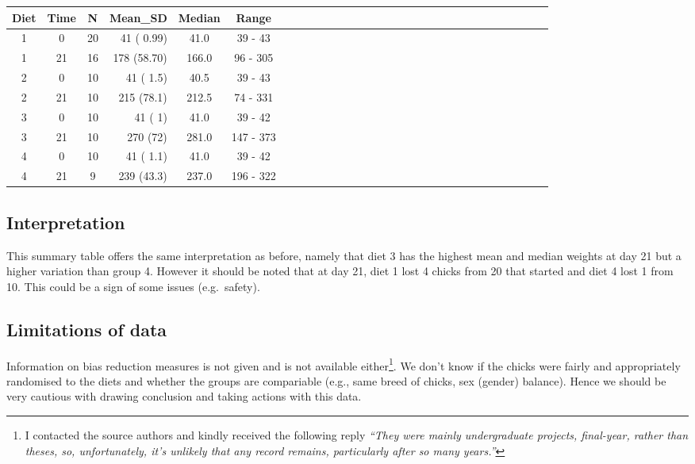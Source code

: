 \documentclass[a4paper,9pt,twocolumn,twoside,printwatermark=false]{pinp}
\begin{document}
\begin{table}[H]
\centering
\begin{tabular}{cccrccccrccccrccccrccccrccccrc}
\toprule
\textbf{Diet} & \textbf{Time} & \textbf{N} & \textbf{Mean\_SD} & \textbf{Median} & \textbf{Range}\\
\midrule
1 & 0 & 20 & 41 ( 0.99) & 41.0 & 39 - 43\\
\rowcolor{lightgray}  1 & 21 & 16 & 178 (58.70) & 166.0 & 96 - 305\\
2 & 0 & 10 & 41 ( 1.5) & 40.5 & 39 - 43\\
\rowcolor{lightgray}  2 & 21 & 10 & 215 (78.1) & 212.5 & 74 - 331\\
3 & 0 & 10 & 41 ( 1) & 41.0 & 39 - 42\\
\rowcolor{lightgray}  3 & 21 & 10 & 270 (72) & 281.0 & 147 - 373\\
4 & 0 & 10 & 41 ( 1.1) & 41.0 & 39 - 42\\
\rowcolor{lightgray}  4 & 21 & 9 & 239 (43.3) & 237.0 & 196 - 322\\
\bottomrule
\end{tabular}
\end{table}

\subsection{Interpretation}\label{interpretation-5}

This summary table offers the same interpretation as before, namely that
diet 3 has the highest mean and median weights at day 21 but a higher
variation than group 4. However it should be noted that at day 21, diet
1 lost 4 chicks from 20 that started and diet 4 lost 1 from 10. This
could be a sign of some issues (e.g.~safety).

\subsection{Limitations of data}\label{limitations-of-data}

Information on bias reduction measures is not given and is not available
either\footnote{I contacted the source authors and kindly received the
  following reply \emph{``They were mainly undergraduate projects,
  final-year, rather than theses, so, unfortunately, it's unlikely that
  any record remains, particularly after so many years.''}}. We don't
know if the chicks were fairly and appropriately randomised to the diets
and whether the groups are compariable (e.g., same breed of chicks, sex
(gender) balance). Hence we should be very cautious with drawing
conclusion and taking actions with this data.
\end{document}
